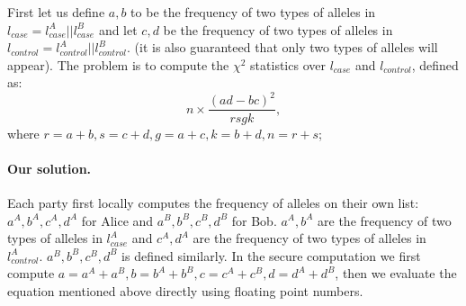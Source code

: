 First let us define $a, b$ to be the frequency of two types of alleles in
$l_{case} = l^A_{case} || l^B_{case}$ and let $c, d$ be the frequency of two types of alleles in
$l_{control} = l^A_{control} || l^B_{control}$. 
(it is also guaranteed
that only two types of alleles will appear). 
The problem is to compute the $\chi^2$ statistics over $l_{case}$ and $l_{control}$, defined as:
$$n\times\frac{(ad-bc)^2}{rsgk},$$
where $r = a + b, s = c + d, g = a + c, k = b + d, n =  r + s$; 


\paragraph{Our solution.}
Each party first locally computes the frequency of alleles on their own list: $a^A,b^A,c^A,d^A$ for Alice
and $a^B,b^B,c^B,d^B$ for Bob. $a^A,b^A$ are the frequency of two types of alleles in $l^A_{case}$ and 
$c^A,d^A$ are the frequency of two types of alleles in $l^A_{control}$. $a^B,b^B,c^B,d^B$  is defined similarly.
In the secure computation we first compute $a = a^A + a^B, b = b^A + b^B,
c = c^A + c^B,d = d^A + d^B$, then we evaluate the equation mentioned above directly using floating point
numbers.

